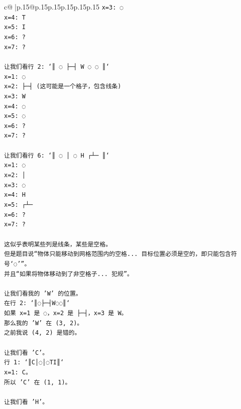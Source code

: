 \documentclass{article}
\begin{document}
{\begin{supertabular}{c@{$\;$}|p{.15\linewidth}@{}p{.15\linewidth}p{.15\linewidth}p{.15\linewidth}p{.15\linewidth}p{.15\linewidth}}
{{{\texttt{x=3: ◌} \\
\texttt{x=4: T} \\
\texttt{x=5: I} \\
\texttt{x=6: ?} \\
\texttt{x=7: ?} \\
\\ 
\texttt{让我们看行 2: `║ ◌ ├─┤ W ◌ ◌ ║`} \\
\texttt{x=1: ◌} \\
\texttt{x=2: ├─┤ (这可能是一个格子，包含线条)} \\
\texttt{x=3: W} \\
\texttt{x=4: ◌} \\
\texttt{x=5: ◌} \\
\texttt{x=6: ?} \\
\texttt{x=7: ?} \\
\\ 
\texttt{让我们看行 6: `║ ◌ │ ◌ H ┌┴─ ║`} \\
\texttt{x=1: ◌} \\
\texttt{x=2: │} \\
\texttt{x=3: ◌} \\
\texttt{x=4: H} \\
\texttt{x=5: ┌┴─} \\
\texttt{x=6: ?} \\
\texttt{x=7: ?} \\
\\ 
\texttt{这似乎表明某些列是线条，某些是空格。} \\
\texttt{但是题目说“物体只能移动到网格范围内的空格... 目标位置必须是空的，即只能包含符号‘◌’”。} \\
\texttt{并且“如果将物体移动到了非空格子... 犯规”。} \\
\\ 
\texttt{让我们看我的 'W' 的位置。} \\
\texttt{在行 2: `║◌├─┤W◌◌║`} \\
\texttt{如果 x=1 是 ◌，x=2 是 ├─┤，x=3 是 W。} \\
\texttt{那么我的 'W' 在 (3, 2)。} \\
\texttt{之前我说 (4, 2) 是错的。} \\
\\ 
\texttt{让我们看 'C'。} \\
\texttt{行 1: `║C│◌│◌TI║`} \\
\texttt{x=1: C。} \\
\texttt{所以 'C' 在 (1, 1)。} \\
\\ 
\texttt{让我们看 'H'。} \\
}}}
\end{supertabular}}
\end{document}
